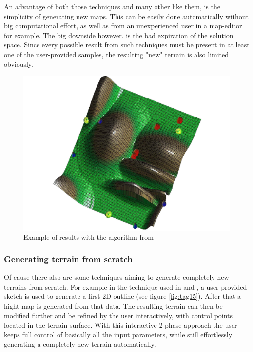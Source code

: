 An advantage of both those techniques and many other like them, is the simplicity of generating new maps. This can be easily done automatically without big computational effort, as well as from an unexperienced user in a map-editor for example. The big downside however, is the bad expiration of the solution space. Since every possible result from such techniques must be present in at least one of the user-provided samples, the resulting "new" terrain is also limited obviously.

\begin{figure}[htb]
	\centering
	\includegraphics[width=\linewidth]{RZL12/rthrhrh.jpg}
	\caption{Example of results with the algorithm from \cite{togelius2010towards}}
	\label{fig:tag23}
\end{figure}

\subsubsection{Generating terrain from scratch}
Of cause there also are some techniques aiming to generate completely new terrains from scratch. For example in the technique used in \cite{ong2005terrain} and \cite{saunders2006realistic}, a user-provided sketch is used to generate a first 2D outline (see figure \ref{fig:tag15}). After that a hight map is generated from that data. The resulting terrain can then be modified further and be refined by the user interactively, with control points located in the terrain surface. With this interactive 2-phase approach the user keeps full control of basically all the input parameters, while still effortlessly generating a completely new terrain automatically.

